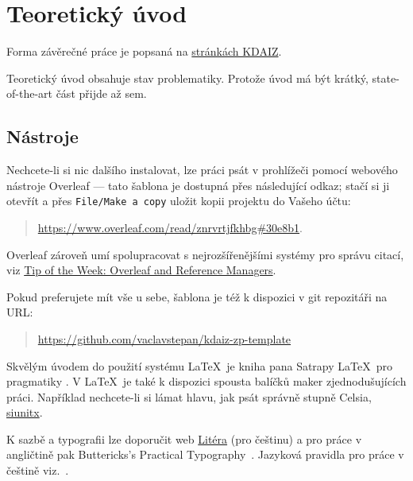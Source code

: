 \chapter{Teoretický úvod}
\label{sec:teorie}

\noindent Forma závěrečné práce je popsaná na \href{ https://kdaiz.fjfi.cvut.cz/studium/bakalarske-studium/bakalarska-prace/}{stránkách KDAIZ}.

Teoretický úvod obsahuje stav problematiky. Protože úvod má být krátký, state-of-the-art část přijde až sem.

\section{Nástroje}
\label{sec:nastroje}

\noindent Nechcete-li si nic dalšího instalovat, lze práci psát v prohlížeči pomocí webového nástroje Overleaf --- tato šablona je dostupná přes následující odkaz; stačí si ji otevřít a přes \texttt{File/Make a copy} uložit kopii projektu do Vašeho účtu:

\begin{quotation}
\href{https://www.overleaf.com/read/znrvrtjfkhbg#30e8b1}{https://www.overleaf.com/read/znrvrtjfkhbg\#30e8b1}. 
\end{quotation}

Overleaf zároveň umí spolupracovat s nejrozšířenějšími systémy pro správu citací, viz \href{https://www.overleaf.com/blog/639-tip-of-the-week-overleaf-and-reference-managers}{Tip of the Week: Overleaf and Reference Managers}. 

Pokud preferujete mít vše u sebe, šablona je též k dispozici v git repozitáři na URL:

\begin{quotation}
    \href{https://github.com/vaclavstepan/kdaiz-zp-template}{https://github.com/vaclavstepan/kdaiz-zp-template}
\end{quotation}

Skvělým úvodem do použití systému \LaTeX\ je kniha pana Satrapy \LaTeX\ pro pragmatiky \cite{satrapa_latex_2011}. V \LaTeX\ je také k dispozici spousta balíčků maker zjednodušujících práci. Například nechcete-li si lámat hlavu, jak psát správně stupně Celsia,  \href{https://texdoc.org/serve/siunitx/0}{siunitx}.

K sazbě a typografii lze doporučit web \href{http://www.liteera.cz}{Litéra} (pro češtinu) a pro práce v angličtině pak Buttericks's Practical Typography~\cite{butterick_matthew_buttericks_nodate}. 
Jazyková pravidla pro práce v češtině viz.~\cite{ijp}.

